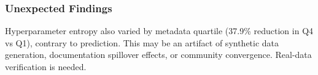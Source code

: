 \begin{table}[htbp]
\centering
{}
\end{table}

\subsubsection{Unexpected Findings}

Hyperparameter entropy also varied by metadata quartile (37.9\% reduction in Q4 vs Q1), contrary to prediction. This may be an artifact of synthetic data generation, documentation spillover effects, or community convergence. Real-data verification is needed.

